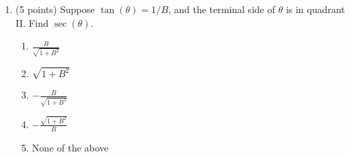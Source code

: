 \documentclass[fleqn]{article}
\begin{document}
\begin{enumerate}
\vspace{0.5in}

\item
(5 points) Suppose $\tan(\theta) = 1/B$, and the terminal side of $\theta$ is in quadrant II.
Find $\sec(\theta)$.

\begin{enumerate}
\item $\displaystyle \frac{B}{\sqrt{1+B^2}}$

\item $\displaystyle \sqrt{1+B^2}$

\item $\displaystyle -\frac{B}{\sqrt{1+B^2}}$

\item $\displaystyle -\frac{\sqrt{1+B^2}}{B}$

\item None of the above

\end{enumerate}

\vspace{0.5in}



\end{enumerate}
\end{document}
